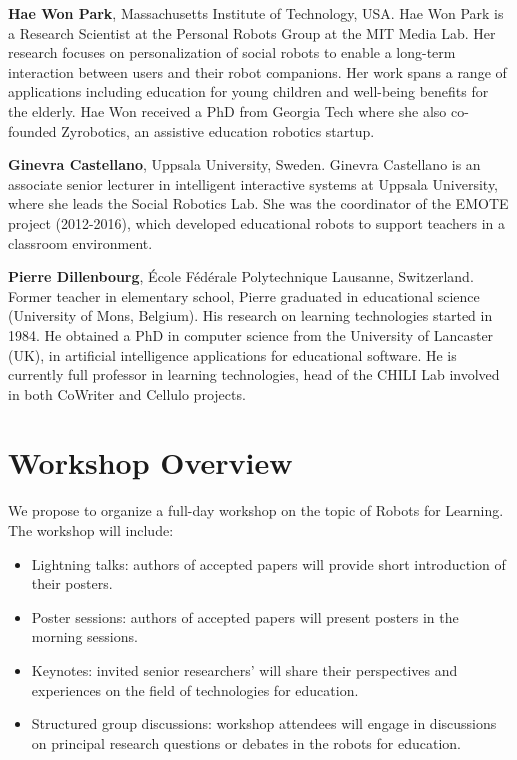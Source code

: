 \documentclass{sig-alternate-05-2015}
\begin{document}
\textbf{Hae Won Park}, Massachusetts Institute of Technology, USA. Hae Won Park is a Research Scientist at the Personal Robots Group at the MIT Media Lab. Her research focuses on personalization of social robots to enable a long-term interaction between users and their robot companions. Her work spans a range of applications including education for young children and well-being benefits for the elderly. Hae Won received a PhD from Georgia Tech where she also co-founded Zyrobotics, an assistive education robotics startup.

\textbf{Ginevra Castellano}, Uppsala University, Sweden. Ginevra Castellano is an associate senior lecturer in intelligent interactive systems at Uppsala University, where she leads the Social Robotics Lab. She was the coordinator of the EMOTE project (2012-2016), which developed educational robots to support teachers in a classroom environment.

\textbf{Pierre Dillenbourg}, École Fédérale Polytechnique Lausanne, Switzerland. Former teacher in elementary school, Pierre graduated in educational science (University of Mons, Belgium). His research on learning technologies started in 1984. He obtained a PhD in computer science from the University of Lancaster (UK), in artificial intelligence applications for educational software. He is currently full professor in learning technologies, head of the CHILI Lab involved in both CoWriter and Cellulo projects.

\section*{Workshop Overview}
We propose to organize a full-day workshop on the topic of Robots for Learning. The workshop will include:
\begin{itemize}[label={--}]
	\item Lightning talks: authors of accepted papers will provide short introduction of their posters.
	\item Poster sessions: authors of accepted papers will present posters in the morning sessions.
	\item Keynotes: invited senior researchers’ will share their perspectives and experiences on the field of technologies for education.
	\item Structured group discussions: workshop attendees will engage in discussions on principal research questions or debates in the robots for education.
\end{itemize}
\end{document}
